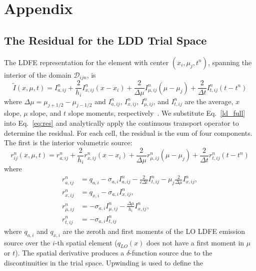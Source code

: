 \documentclass{anstrans}
\begin{document}
\appendix
\section{Appendix}

\subsection{The Residual for the LDD Trial Space}
\label{app:res}

The LDFE representation for the element with center $(x_i,\mu_j, t^n)$, spanning the interior of the domain
$\mathcal{D}_{ijn}$, is 
\begin{equation}\label{ld_full}
    \tilde I(x,\mu,t) = I_{a,ij}^{n} + \frac{2}{h_{i}}I_{x,ij}^{n}\left(x-x_i\right) +
    \frac{2}{\Delta \mu}I_{\mu,ij}^n\left(\mu-\mu_j\right) +
    \frac{2}{\Delta t}I_{t,ij}^{n}\left(t-t^{n}\right)
\end{equation}
where $\Delta \mu = \mu_{j+1/2} - \mu_{j-1/2}$ and $I_{a,ij}^n$, $I_{x,ij}^n$, $I_{\mu,ij}^n$, and 
$I_{t,ij}^n$ are the average, $x$ slope, $\mu$ slope, and $t$ slope moments,
respectively~\cite{dissertation}.   We substitute
Eq.~\eqref{ld_full} into Eq.~\eqref{eq:res} and analytically apply the continuous transport operator to determine the
residual.  For each cell, the residual is the sum of four components.  The first is the interior volumetric source:
\begin{equation}
    r_{ij}^{n}(x,\mu,t) = r_{a,ij}^n + \frac{2}{h_i}r_{x,ij}^n\left(x-x_i\right) + 
    \frac{2}{\Delta \mu}r_{\mu,ij}^n\left(\mu-\mu_j\right) +
    \frac{2}{\Delta t}r_{t,ij}^{n}\left(t-t^{n}\right)
\end{equation}
where
\begin{align}
    r_{a,ij}^n &= q_{a,i} - \sigma_{a,i}I^n_{a,ij} - \frac{2}{c \Delta t} I_{t,ij}^n - \mu_{j}\frac{2}{\Delta
    \mu}I_{x,ij}^n, \\ 
    r_{x,ij}^n &= q_{x,i} - \sigma_{a,i}I^n_{x,ij}, \\ 
    r_{\mu,ij}^n &= -\sigma_{a,i}I^{n}_{\mu,ij} - \frac{\Delta \mu}{h_{i}}I^{n}_{x,ij}, \\
    r_{t,ij}^n &= -\sigma_{a,i}I^{n}_{t,ij}
\end{align}
where $q_{a,i}$ and $q_{x,i}$ are the zeroth and first moments of the LO LDFE emission source over the
$i$-th spatial element ($q_{LO}(x)$ does not have a first moment in $\mu$ or $t$).  The spatial derivative produces a
$\delta$-function source due to the discontinuities in the trial space. Upwinding is used to define the
\end{document}
